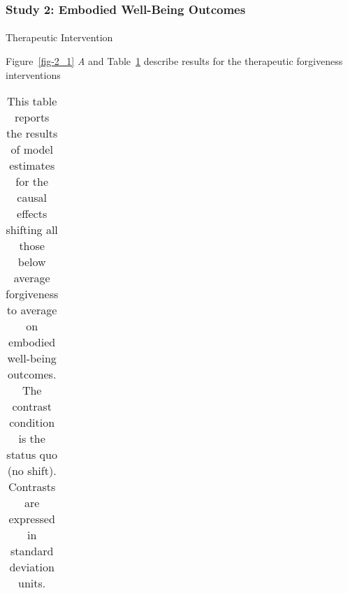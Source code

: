 \documentclass[
  single column]{article}
\makeatletter
\let\oldparagraph\paragraph
\renewcommand{\paragraph}{
    \@ifstar
      \xxxParagraphStar
      \xxxParagraphNoStar
  }
\newcommand{\xxxParagraphStar}[1]{\oldparagraph*{#1}\mbox{}}
\newcommand{\xxxParagraphNoStar}[1]{\oldparagraph{#1}\mbox{}}
\makeatother
\begin{document}
\newpage{}

\subsubsection{Study 2: Embodied Well-Being
Outcomes}\label{study-2-embodied-well-being-outcomes}

\paragraph{Therapeutic Intervention}\label{therapeutic-intervention-1}

Figure~\ref{fig-2_1} \emph{A} and Table~\ref{tbl-2_1} describe results
for the therapeutic forgiveness interventions

\begin{longtable}[]{@{}
  >{\raggedright\arraybackslash}p{}
  >{\raggedleft\arraybackslash}p{}
  >{\raggedleft\arraybackslash}p{}
  >{\raggedleft\arraybackslash}p{}
  >{\raggedleft\arraybackslash}p{}
  >{\raggedleft\arraybackslash}p{}@{}}

\caption{\label{tbl-2_1}This table reports the results of model
estimates for the causal effects shifting all those below average
forgiveness to average on embodied well-being outcomes. The contrast
condition is the status quo (no shift). Contrasts are expressed in
standard deviation units.}

\tabularnewline


\end{longtable}
\end{document}
